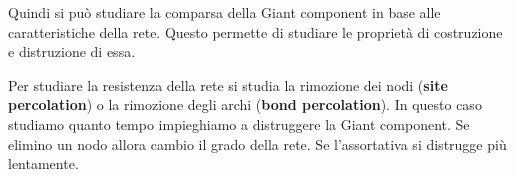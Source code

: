 Quindi si può studiare la comparsa della Giant component in base alle caratteristiche
della rete. Questo permette di studiare le proprietà di costruzione e distruzione
di essa.

Per studiare la resistenza della rete si studia la rimozione dei nodi (\textbf{site
    percolation}) o la rimozione degli archi (\textbf{bond percolation}). In
questo caso studiamo quanto tempo impieghiamo a distruggere la Giant component.
Se elimino un nodo allora cambio il grado della rete. Se l'assortativa si distrugge
più lentamente.